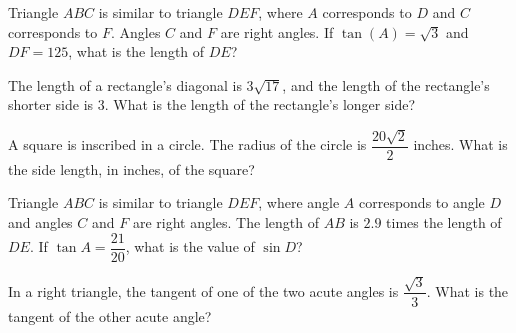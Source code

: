 \noindent\markforreview
\vspace{1em}

Triangle $ABC$ is similar to triangle $DEF$, where $A$ corresponds to $D$ and $C$ corresponds to $F$. Angles $C$ and $F$ are right angles. If $\tan(A) = \sqrt{3}$ and $DF = 125$, what is the length of $DE$?

\vspace{0.75em}


\vspace{2em}

\noindent\markforreview
\vspace{1em}

The length of a rectangle’s diagonal is $3\sqrt{17}$, and the length of the rectangle’s shorter side is $3$. What is the length of the rectangle’s longer side?

\vspace{2em}


\newpage
\noindent\markforreview
\vspace{1em}

A square is inscribed in a circle. The radius of the circle is $\dfrac{20\sqrt{2}}{2}$ inches. What is the side length, in inches, of the square?

\vspace{0.75em}


\vspace{2em}

\noindent\markforreview
\vspace{1em}

Triangle $ABC$ is similar to triangle $DEF$, where angle $A$ corresponds to angle $D$ and angles $C$ and $F$ are right angles. The length of $AB$ is $2.9$ times the length of $DE$. If $\tan A = \dfrac{21}{20}$, what is the value of $\sin D$?

\vspace{2em}
\newpage
\noindent\markforreview
\vspace{1em}

In a right triangle, the tangent of one of the two acute angles is $\dfrac{\sqrt{3}}{3}$. What is the tangent of the other acute angle?

\vspace{0.75em}

